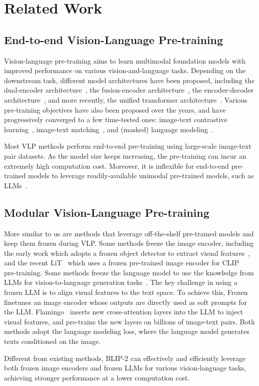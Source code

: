 \vspace{-1.5ex}
\section{Related Work}
\vspace{-0.5ex}
\label{sec:related}

\subsection{End-to-end Vision-Language Pre-training}
\vspace{-0.5ex}

Vision-language pre-training aims to learn multimodal foundation models with improved performance on various vision-and-language tasks.
Depending on the downstream task, different model architectures have been proposed, including the dual-encoder architecture~\cite{clip,align}, the fusion-encoder architecture~\cite{LXMERT,ALBEF}, the encoder-decoder architecture~\cite{VL_T5,simvlm,pali},
and more recently, the unified transformer architecture~\cite{blip,beit3}.
Various pre-training objectives have also been proposed over the years,
and have progressively converged to a few time-tested ones: image-text contrastive learning~\cite{clip,filip,ALBEF,blip},
image-text matching~\cite{ALBEF,blip,VLMo},
and (masked) language modeling~\cite{ALBEF,blip,coca,beit3}.

Most VLP methods perform end-to-end pre-training using large-scale image-text pair datasets.
As the model size keeps increasing, the pre-training can incur an extremely high computation cost.
Moreover, it is inflexible for end-to-end pre-trained models to leverage readily-available unimodal pre-trained models,
such as LLMs~\cite{gpt3,opt,flanT5}.

\vspace{-0.5ex}
\subsection{Modular Vision-Language Pre-training}
\vspace{-0.5ex}
More similar to us are methods that leverage off-the-shelf pre-trained models and keep them frozen during VLP.
Some methods freeze the image encoder, including the early work which adopts a frozen object detector to extract visual features~\cite{uniter,oscar,vinvl},
and the recent LiT~\cite{LiT} which uses a frozen pre-trained image encoder for CLIP~\cite{clip} pre-training.
Some methods freeze the language model to use the knowledge from LLMs for vision-to-language generation tasks~\cite{Frozen,flamingo,vgpt,mapl,pnp-vqa,img2prompt}.
The key challenge in using a frozen LLM is to align visual features to the text space.
%
To achieve this, Frozen~\cite{Frozen} finetunes an image encoder whose outputs are directly used as soft prompts for the LLM.
Flamingo~\cite{flamingo} inserts new cross-attention layers into the LLM to inject visual features, 
and pre-trains the new layers on billions of image-text pairs.
Both methods adopt the language modeling loss,
where the language model generates texts conditioned on the image.

Different from existing methods,
BLIP-2 can effectively and efficiently leverage both frozen image encoders and frozen LLMs for various vision-language tasks,
achieving stronger performance at a lower computation cost.

